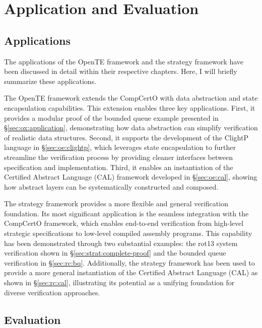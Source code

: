 \chapter{Application and Evaluation}
\label{ch:application}

\section{Applications}

The applications of the OpenTE framework
and the strategy framework
have been discussed in detail
within their respective chapters.
Here, I will briefly summarize these applications.

The OpenTE framework extends the CompCertO
with data abstraction and state encapsulation capabilities.
This extension enables three key applications.
First, it provides a modular proof of the bounded queue example
presented in \S\ref{sec:ox:application},
demonstrating how data abstraction can simplify verification of realistic data structures.
Second, it supports the development of the ClightP language
in \S\ref{sec:oe:clightp},
which leverages state encapsulation
to further streamline the verification process
by providing cleaner interfaces between specification and implementation.
Third, it enables an instantiation of the Certified Abstract Language (CAL)
framework developed in \S\ref{sec:oe:cal},
showing how abstract layers
can be systematically constructed and composed.

The strategy framework provides a more flexible and general verification foundation.
Its most significant application is the seamless integration with the CompCertO framework,
which enables end-to-end verification
from high-level strategic specifications to low-level compiled assembly programs.
This capability has been demonstrated through two substantial examples:
the rot13 system verification shown in \S\ref{sec:strat:complete-proof}
and the bounded queue verification in \S\ref{sec:rc:bq}.
Additionally, the strategy framework
has been used to provide a more general instantiation of the Certified Abstract Language (CAL)
as shown in \S\ref{sec:rc:cal},
illustrating its potential
as a unifying foundation for diverse verification approaches.

\section{Evaluation}


